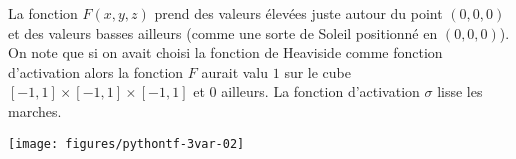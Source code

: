 \documentclass[11pt,class=report,crop=false]{standalone}
\begin{document}

La fonction $F(x,y,z)$ prend des valeurs élevées juste autour du point $(0,0,0)$ et des valeurs basses ailleurs (comme une sorte de Soleil positionné en $(0,0,0)$). On note que si on avait choisi la fonction de Heaviside comme fonction d'activation alors la fonction $F$ aurait valu $1$ sur le cube $[-1,1]\times [-1,1]\times[-1,1]$ et $0$ ailleurs. La fonction d'activation $\sigma$ \og{}lisse\fg{} les marches.


\begin{center}
\texttt{[image: figures/pythontf-3var-02]}
\end{center}
\end{document}
